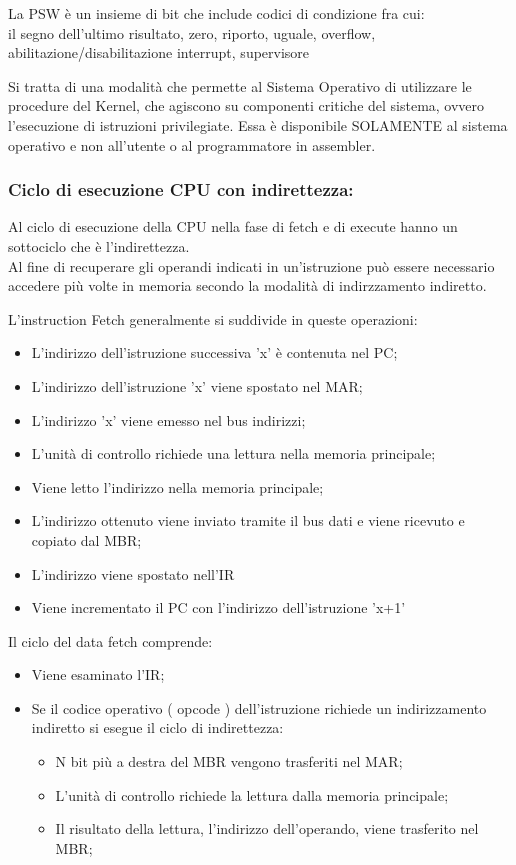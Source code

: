 \documentclass[arch.tex]{subfiles}
\begin{document}
La PSW è un insieme di bit che include codici di condizione fra cui:\\
il segno dell'ultimo risultato, zero, riporto, uguale, overflow, abilitazione/disabilitazione interrupt, supervisore

Si tratta di una modalità che permette al Sistema Operativo di utilizzare le procedure del Kernel, che agiscono su componenti
critiche del sistema, ovvero l'esecuzione di istruzioni privilegiate. Essa è disponibile SOLAMENTE al sistema operativo e non 
all'utente o al programmatore in assembler.

\subsubsection{Ciclo di esecuzione CPU con indirettezza:}
Al ciclo di esecuzione della CPU nella fase di fetch e di execute hanno un sottociclo che è l'indirettezza.\\
Al fine di recuperare gli operandi indicati in un'istruzione può essere necessario accedere più volte in memoria
secondo la modalità di indirzzamento indiretto.

%
\label{par:flusso_dei_dati}
L'instruction Fetch generalmente si suddivide in queste operazioni:

\begin{itemize}
	\item L'indirizzo dell'istruzione successiva 'x' è contenuta nel PC;
	\item L'indirizzo dell'istruzione 'x' viene spostato nel MAR;
	\item L'indirizzo 'x' viene emesso nel bus indirizzi;
	\item L'unità di controllo richiede una lettura nella memoria principale;
	\item Viene letto l'indirizzo nella memoria principale;
	\item L'indirizzo ottenuto viene inviato tramite il bus dati e viene 
		ricevuto e copiato dal MBR;
	\item L'indirizzo viene spostato nell'IR
	\item Viene incrementato il PC con l'indirizzo dell'istruzione 'x+1'
\end{itemize}


%
\label{par:data_fetch}
Il ciclo del data fetch comprende:

\begin{itemize}
	\item Viene esaminato l'IR;
	\item Se il codice operativo ( opcode ) dell'istruzione richiede un indirizzamento indiretto
		si esegue il ciclo di indirettezza:
		\begin{itemize}
			\item N bit più a destra del MBR vengono trasferiti nel MAR;
			\item L'unità di controllo richiede la lettura dalla memoria principale;
			\item Il risultato della lettura, l'indirizzo dell'operando, viene trasferito
				nel MBR;
		\end{itemize}
\end{itemize}
\end{document}
